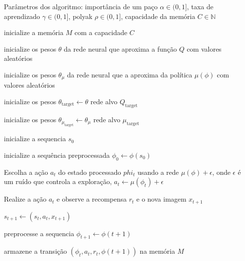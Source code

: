 \begin{algorithm}[H]
    Parâmetros dos algoritmo:
    importância de um paço $\alpha \in (0,1]$,
    taxa de aprendizado $\gamma \in (0,1]$,
    polyak $\rho \in (0,1]$,
    capacidade da memória $C \in \mathbb{N}$ 

    inicialize a memória $M$ com a capacidade $C$

    inicialize os pesos $\theta$ da rede neural que aproxima a função $Q$ com valores aleatórios

    inicialize os pesos $\theta_\mu$ da rede neural que a aproxima da política $\mu(\phi)$ com valores aleatórios

    inicialize os pesos $\theta_{\text{target}}  \leftarrow \theta$ rede alvo $Q_{\text{target}}$

    inicialize os pesos $\theta_{\mu_{\text{target}}}  \leftarrow \theta_\mu$ rede alvo $\mu_{\text{target}}$


     {
        inicialize a sequencia $s_0$

        inicialize a sequência preprocessada $\phi_0 \leftarrow \phi(s_0)$ 
        

         {
            Escolha a ação $a_t$ do estado processado $phi_t$ usando a rede  $\mu(\phi) + \epsilon$, onde
            $\epsilon$ é um ruído que controla a exploração, $a_t \leftarrow \mu(\phi_t)  + \epsilon$ 

            Realize a ação $a_t$ e observe a recompensa $r_t$ e o nova imagem $x_{t+1}$
            
            $s_{t+1}  \leftarrow (s_t, a_t, x_{t+1})$   

            preprocesse a sequencia $\phi_{t+1} \leftarrow \phi(t+1)$
            
            armazene a transição $(\phi_t,a_t,r_t,\phi(t+1))$ na memória $M$

            }}
\end{algorithm}
